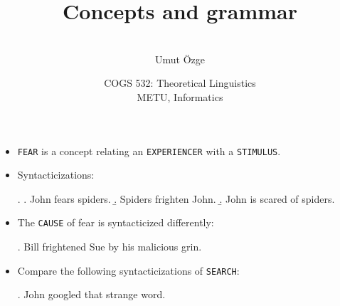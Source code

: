 \documentclass[ignorenonframetext,10pt,aspectratio=169]{beamer}
\title{Concepts and grammar}
\author{\  \\ \vspace{20pt} Umut \"Ozge\\  }
\date{COGS 532: Theoretical Linguistics\\ METU, Informatics}
\begin{document}
\begin{frame}\frametitle{}
\thispagestyle{empty}
\maketitle
\end{frame}

\begin{frame}[t,plain]
\begin{itemize}
\item \Verb+FEAR+ is a concept relating an \Verb+EXPERIENCER+ with a \Verb+STIMULUS+.

\item Syntacticizations:

\ex. \a. John fears spiders.
\b. Spiders frighten John.
\b. John is scared of spiders.

\item The \Verb+CAUSE+ of fear is syntacticized differently:

\ex. Bill frightened Sue by his malicious grin.

\item Compare the following syntacticizations of \Verb+SEARCH+:

\ex. John googled that strange word.

\end{itemize}
\end{frame}

\begin{frame}[t,plain]

\end{frame}

\begin{frame}[t,plain]

\end{frame}

\begin{frame}[t,plain]

\end{frame}

\begin{frame}[t,plain]

\end{frame}
\end{document}
